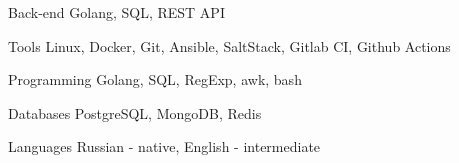

\begin{cvskills}

  \cvskill
    {Back-end} %
    {Golang, SQL, REST API} %

  \cvskill
    {Tools} %
    {Linux, Docker, Git, Ansible, SaltStack, Gitlab CI, Github Actions} %


  \cvskill
    {Programming} %
    {Golang, SQL, RegExp, awk, bash} %

  \cvskill
    {Databases} %
    {PostgreSQL, MongoDB, Redis} %


  \cvskill
    {Languages} %
    {Russian - native, English - intermediate } %

\end{cvskills}
